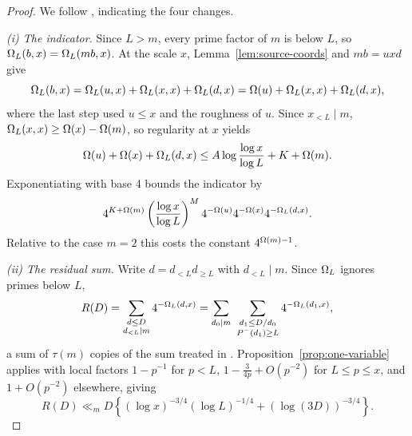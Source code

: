 \documentclass[11pt]{article}
\begin{document}
\begin{proof}
We follow \cite[Prop.~4.2]{DellaPietra2026}, indicating the four changes.

\emph{(i) The indicator.} Since \(L>m\), every prime factor of \(m\) is below
\(L\), so \(\Omega_L(b,x)=\Omega_L(mb,x)\). At the scale \(x\),
Lemma~\ref{lem:source-coords} and \(mb=uxd\) give
\[
 \Omega_L(b,x)=\Omega_L(u,x)+\Omega_L(x,x)+\Omega_L(d,x)
 =\Omega(u)+\Omega_L(x,x)+\Omega_L(d,x),
\]
where the last step used \(u\leq x\) and the roughness of \(u\). Since \(x_{<L}\mid m\),
\(\Omega_L(x,x)\geq\Omega(x)-\Omega(m)\), so regularity at \(x\) yields
\[
 \Omega(u)+\Omega(x)+\Omega_L(d,x)\leq A\log\frac{\log x}{\log L}+K+\Omega(m).
\]
Exponentiating with base \(4\) bounds the indicator by
\begin{equation}\label{eq:source-indicator}
 4^{K+\Omega(m)}\left(\frac{\log x}{\log L}\right)^{M}
 4^{-\Omega(u)}4^{-\Omega(x)}4^{-\Omega_L(d,x)} .
\end{equation}
Relative to the case \(m=2\) this costs the constant \(4^{\Omega(m)-1}\).

\emph{(ii) The residual sum.} Write \(d=d_{<L}d_{\geq L}\) with
\(d_{<L}\mid m\). Since \(\Omega_L\) ignores primes below \(L\),
\[
 R(D)=\sum_{\substack{d\leq D\\ d_{<L}\mid m}}4^{-\Omega_L(d,x)}
 =\sum_{d_0\mid m}\ \sum_{\substack{d_1\leq D/d_0\\ P^-(d_1)\geq L}}
 4^{-\Omega_L(d_1,x)} ,
\]
a sum of \(\tau(m)\) copies of the sum treated in
\cite[(4.6)]{DellaPietra2026}. Proposition~\ref{prop:one-variable} applies with local
factors \(1-p^{-1}\) for \(p<L\), \(1-\frac{3}{4p}+O(p^{-2})\) for
\(L\leq p\leq x\), and \(1+O(p^{-2})\) elsewhere, giving
\begin{equation}\label{eq:source-residual}
 R(D)\ll_m D\left\{(\log x)^{-3/4}(\log L)^{-1/4}+(\log(3D))^{-3/4}\right\}.
\end{equation}


\end{proof}
\end{document}
